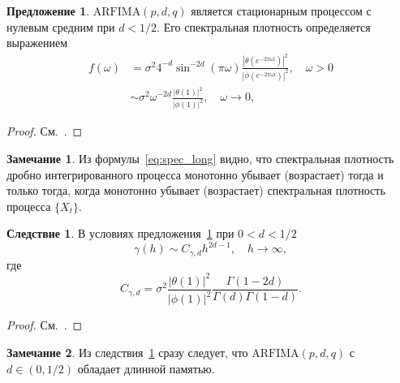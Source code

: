 \documentclass[specialist,
substylefile = spbu_report.rtx,
subf,href,colorlinks=true, 12pt]{disser}
\theoremstyle{definition}
\newtheorem{remark}{Замечание}[section]
\newtheorem{example}{Пример}[section]
\newtheorem{proposition}{Предложение}[section]
\newtheorem{corollary}{Следствие}[section]
\newcommand{\im}{\mathrm{i}}
\begin{document}
\begin{proposition}\label{prop1}
	$\mathrm{ARFIMA}(p, d, q)$ является стационарным процессом с нулевым средним при $d<1/2$. Его спектральная плотность определяется выражением
	\begin{equation}\label{eq:spec_long}
		\begin{aligned}
			f(\omega) & =\sigma^2 4^{-d}\sin^{-2d}\left(\pi\omega\right)\frac{\left|\theta(e^{-2\pi \omega\im})\right|^2}{\left|\phi(e^{-2\pi\omega\im})\right|^2},\quad\omega>0\\
			&\sim\sigma^2\omega^{-2d}\frac{|\theta(1)|^2}{|\phi(1)|^2},\quad \omega\to0,
		\end{aligned}
	\end{equation}
\end{proposition}
\begin{proof}
	См.~\cite[Proposition 6.1]{Hassler2018}.
\end{proof}
\begin{remark}
	Из формулы~\eqref{eq:spec_long} видно, что спектральная плотность дробно интегрированного процесса монотонно убывает (возрастает) тогда и только тогда, когда монотонно убывает (возрастает) спектральная плотность процесса $\{X_t\}$.
\end{remark}
\begin{corollary}\label{corollary1}
	В условиях предложения~\ref{prop1} при $0<d<1/2$
	\[
		\gamma(h)\sim C_{\gamma,d}h^{2d-1},\quad h\to\infty,
	\]
	где
	\[
		C_{\gamma,d}=\sigma^2 \frac{|\theta(1)|^2}{|\phi(1)|^2} \frac{\Gamma(1-2d)}{\Gamma(d)\Gamma(1-d)}.
	\]
\end{corollary}
\begin{proof}
	См.~\cite[Corollary 6.1]{Hassler2018}.
\end{proof}
\begin{remark}
	Из следствия~\ref{corollary1} сразу следует, что $\mathrm{ARFIMA}(p, d, q)$ с $d\in(0, 1/2)$ обладает длинной памятью.
\end{remark}
\end{document}
